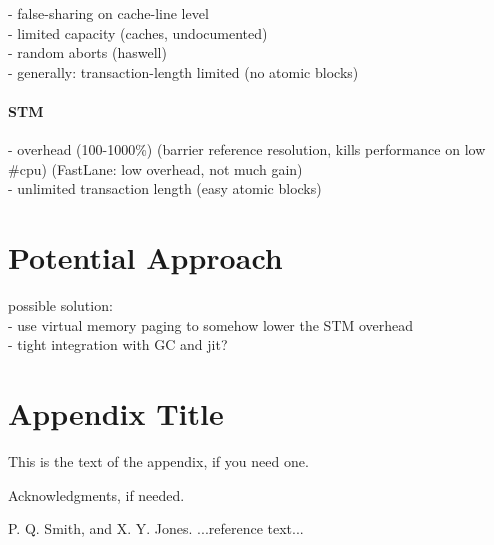 \documentclass{sigplanconf}
\begin{document}
- false-sharing on cache-line level\\
- limited capacity (caches, undocumented)\\
- random aborts (haswell)\\
- generally: transaction-length limited (no atomic blocks)

\paragraph{STM}

- overhead (100-1000\%) (barrier reference resolution, kills performance on low \#cpu)
(FastLane: low overhead, not much gain)\\
- unlimited transaction length (easy atomic blocks)

\section{Potential Approach}
possible solution:\\
- use virtual memory paging to somehow lower the STM overhead\\
- tight integration with GC and jit?


\appendix
\section{Appendix Title}

This is the text of the appendix, if you need one.

\acks

Acknowledgments, if needed.





\begin{thebibliography}{}
\softraggedright

P. Q. Smith, and X. Y. Jones. ...reference text...

\end{thebibliography}
\end{document}
